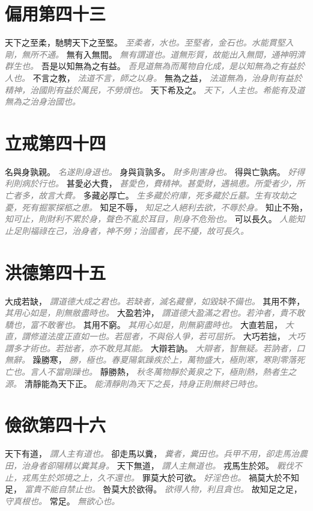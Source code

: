 \documentclass[a4paper,zihao=-4,oneside,landscape,UTF8]{ctexart}
\newcommand{\zhushi}[1]{\scriptsize{\textit{\textcolor{gray}{#1}}}\normalsize}
\begin{document}
\section{偏用第四十三}

天下之至柔，馳騁天下之至堅。
\zhushi{至柔者，水也。至堅者，金石也。水能貫堅入剛，無所不通。}
無有入無間。
\zhushi{無有謂道也。道無形質，故能出入無間，通神明濟群生也。}
吾是以知無為之有益。
\zhushi{吾見道無為而萬物自化成，是以知無為之有益於人也。}
不言之教，
\zhushi{法道不言，師之以身。}
無為之益，
\zhushi{法道無為，治身則有益於精神，治國則有益於萬民，不勞煩也。}
天下希及之。
\zhushi{天下，人主也。希能有及道無為之治身治國也。}


\section{立戒第四十四}

名與身孰親。
\zhushi{名遂則身退也。}
身與貨孰多。
\zhushi{財多則害身也。}
得與亡孰病。
\zhushi{好得利則病於行也。}
甚愛必大費，
\zhushi{甚愛色，費精神。甚愛財，遇禍患。所愛者少，所亡者多，故言大費。}
多藏必厚亡。
\zhushi{生多藏於府庫，死多藏於丘墓。生有攻劫之憂，死有掘冢探柩之患。}
知足不辱，
\zhushi{知足之人絕利去欲，不辱於身。}
知止不殆，
\zhushi{知可止，則財利不累於身，聲色不亂於耳目，則身不危殆也。}
可以長久。
\zhushi{人能知止足則福祿在己，治身者，神不勞；治國者，民不擾，故可長久。}


\section{洪德第四十五}

大成若缺，
\zhushi{謂道德大成之君也。若缺者，滅名藏譽，如毀缺不備也。}
其用不弊，
\zhushi{其用心如是，則無敝盡時也。}
大盈若沖，
\zhushi{謂道德大盈滿之君也。若沖者，貴不敢驕也，富不敢奢也。}
其用不窮。
\zhushi{其用心如是，則無窮盡時也。}
大直若屈，
\zhushi{大直，謂修道法度正直如一也。若屈者，不與俗人爭，若可屈折。}
大巧若拙，
\zhushi{大巧謂多才術也。若拙者，亦不敢見其能。}
大辯若訥。
\zhushi{大辯者，智無疑。若訥者，口無辭。}
躁勝寒，
\zhushi{勝，極也。春夏陽氣躁疾於上，萬物盛大，極則寒，寒則零落死亡也。言人不當剛躁也。}
靜勝熱，
\zhushi{秋冬萬物靜於黃泉之下，極則熱，熱者生之源。}
清靜能為天下正。
\zhushi{能清靜則為天下之長，持身正則無終已時也。}


\section{儉欲第四十六}

天下有道，
\zhushi{謂人主有道也。}
卻走馬以糞，
\zhushi{糞者，糞田也。兵甲不用，卻走馬治農田，治身者卻陽精以糞其身。}
天下無道，
\zhushi{謂人主無道也。}
戎馬生於郊。
\zhushi{戰伐不止，戎馬生於郊境之上，久不還也。}
罪莫大於可欲。
\zhushi{好淫色也。}
禍莫大於不知足，
\zhushi{富貴不能自禁止也。}
咎莫大於欲得。
\zhushi{欲得人物，利且貪也。}
故知足之足，
\zhushi{守真根也。}
常足。
\zhushi{無欲心也。}
\end{document}
